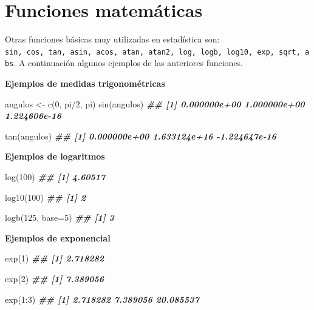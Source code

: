 \documentclass[
]{book}
\newenvironment{Shaded}{\begin{snugshade}}{\end{snugshade}}
\newcommand{\AttributeTok}[1]{\textcolor[rgb]{0.77,0.63,0.00}{#1}}
\newcommand{\DecValTok}[1]{\textcolor[rgb]{0.00,0.00,0.81}{#1}}
\newcommand{\DocumentationTok}[1]{\textcolor[rgb]{0.56,0.35,0.01}{\textbf{\textit{#1}}}}
\newcommand{\FunctionTok}[1]{\textcolor[rgb]{0.00,0.00,0.00}{#1}}
\newcommand{\NormalTok}[1]{#1}
\newcommand{\OtherTok}[1]{\textcolor[rgb]{0.56,0.35,0.01}{#1}}
\newcommand{\SpecialCharTok}[1]{\textcolor[rgb]{0.00,0.00,0.00}{#1}}
\begin{document}
\hypertarget{funciones-matemuxe1ticas}{%
\section{Funciones matemáticas}\label{funciones-matemuxe1ticas}}

Otras funciones básicas muy utilizadas en estadística son: \texttt{sin,\ cos,\ tan,\ asin,\ acos,\ atan,\ atan2,\ log,\ logb,\ log10,\ exp,\ sqrt,\ abs}. A continuación algunos ejemplos de las anteriores funciones.

\textbf{Ejemplos de medidas trigonométricas}

\begin{Shaded}
\begin{Highlighting}[]
\NormalTok{angulos }\OtherTok{\textless{}{-}} \FunctionTok{c}\NormalTok{(}\DecValTok{0}\NormalTok{, pi}\SpecialCharTok{/}\DecValTok{2}\NormalTok{, pi)}
\FunctionTok{sin}\NormalTok{(angulos)}
\DocumentationTok{\#\# [1] 0.000000e+00 1.000000e+00 1.224606e{-}16}

\FunctionTok{tan}\NormalTok{(angulos)}
\DocumentationTok{\#\# [1]  0.000000e+00  1.633124e+16 {-}1.224647e{-}16}
\end{Highlighting}
\end{Shaded}

\textbf{Ejemplos de logaritmos}

\begin{Shaded}
\begin{Highlighting}[]
\FunctionTok{log}\NormalTok{(}\DecValTok{100}\NormalTok{)}
\DocumentationTok{\#\# [1] 4.60517}

\FunctionTok{log10}\NormalTok{(}\DecValTok{100}\NormalTok{)}
\DocumentationTok{\#\# [1] 2}

\FunctionTok{logb}\NormalTok{(}\DecValTok{125}\NormalTok{, }\AttributeTok{base=}\DecValTok{5}\NormalTok{)}
\DocumentationTok{\#\# [1] 3}
\end{Highlighting}
\end{Shaded}

\textbf{Ejemplos de exponencial}

\begin{Shaded}
\begin{Highlighting}[]
\FunctionTok{exp}\NormalTok{(}\DecValTok{1}\NormalTok{)}
\DocumentationTok{\#\# [1] 2.718282}

\FunctionTok{exp}\NormalTok{(}\DecValTok{2}\NormalTok{)}
\DocumentationTok{\#\# [1] 7.389056}

\FunctionTok{exp}\NormalTok{(}\DecValTok{1}\SpecialCharTok{:}\DecValTok{3}\NormalTok{)}
\DocumentationTok{\#\# [1]  2.718282  7.389056 20.085537}
\end{Highlighting}
\end{Shaded}
\end{document}
